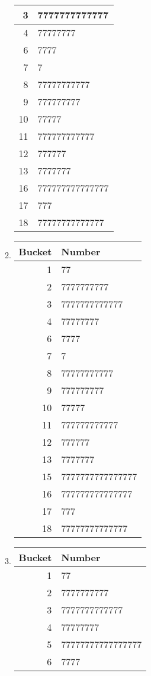 \documentclass[12pt]{article}
\begin{document}
\begin{enumerate}[a]
\begin{multicols}{2}
\begin{enumerate}[1]
\begin{tabular}{r|l}
			3 & 7777777777777\\\hline
			4 & 77777777\\\hline
			6 & 7777\\\hline
			7 & 7\\\hline
			8 & 77777777777\\\hline
			9 & 777777777\\\hline
			10 & 77777\\\hline
			11 & 777777777777\\\hline
			12 & 777777\\\hline
			13 & 7777777\\\hline
			16 & 777777777777777\\\hline
			17 & 777\\\hline
			18 & 77777777777777
		\end{tabular}
		\item
		\begin{tabular}{r|l}
			Bucket & Number\\\hline\hline
			1 & 77\\\hline
			2 & 7777777777\\\hline
			3 & 7777777777777\\\hline
			4 & 77777777\\\hline
			6 & 7777\\\hline
			7 & 7\\\hline
			8 & 77777777777\\\hline
			9 & 777777777\\\hline
			10 & 77777\\\hline
			11 & 777777777777\\\hline
			12 & 777777\\\hline
			13 & 7777777\\\hline
			15 & 7777777777777777\\\hline
			16 & 777777777777777\\\hline
			17 & 777\\\hline
			18 & 77777777777777
		\end{tabular}
		\item
		\begin{tabular}{r|l}
			Bucket & Number\\\hline\hline
			1 & 77\\\hline
			2 & 7777777777\\\hline
			3 & 7777777777777\\\hline
			4 & 77777777\\\hline
			5 & 77777777777777777\\\hline
			6 & 7777\\\hline

\end{tabular}
\end{enumerate}
\end{multicols}
\end{enumerate}
\end{document}
